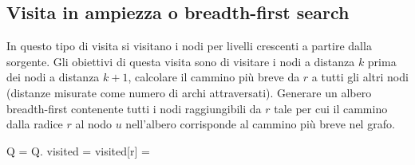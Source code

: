 \subsection{Visita in ampiezza o breadth-first search}
In questo tipo di visita si visitano i nodi per livelli crescenti a partire dalla sorgente. Gli obiettivi di questa visita sono di visitare i nodi a 
distanza $k$ prima dei nodi a distanza $k+1$, calcolare il cammino pi\`u breve da $r$ a tutti gli altri nodi (distanze misurate come numero di archi 
attraversati). Generare un albero breadth-first contenente tutti i nodi raggiungibili da $r$ tale per cui il cammino dalla radice $r$ al nodo $u$ 
nell'albero corrisponde al cammino pi\`u breve nel grafo.
\begin{algorithm}
\DontPrintSemicolon
{}
\caption{\protect{}}

\Set Q = \SetCos{} \;
Q.\;
\Boolean[] visited = \New \Boolean[G.\Size{}]\;
visited[r] = \True\;
\end{algorithm}
